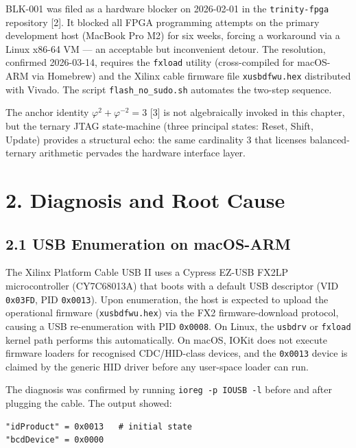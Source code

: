 BLK-001 was filed as a hardware blocker on
2026-02-01 in the \texttt{trinity-fpga} repository
[2]. It blocked all FPGA programming attempts
on the primary development host (MacBook Pro M2)
for six weeks, forcing a workaround via a Linux
x86-64 VM --- an acceptable but inconvenient
detour. The resolution, confirmed 2026-03-14,
requires the \texttt{fxload} utility
(cross-compiled for macOS-ARM via Homebrew) and
the Xilinx cable firmware file
\texttt{xusbdfwu.hex} distributed with Vivado. The
script \texttt{flash\_no\_sudo.sh} automates the
two-step sequence.

The anchor identity
\(\varphi^2 + \varphi^{-2} = 3\) [3] is not
algebraically invoked in this chapter, but the
ternary JTAG state-machine (three principal
states: Reset, Shift, Update) provides a
structural echo: the same cardinality \(3\) that
licenses balanced-ternary arithmetic pervades the
hardware interface layer.

\section{2. Diagnosis and Root
Cause}\label{fa_33:diagnosis-and-root-cause}

\subsection{2.1 USB Enumeration on
macOS-ARM}\label{fa_33:usb-enumeration-on-macos-arm}

The Xilinx Platform Cable USB II uses a Cypress
EZ-USB FX2LP microcontroller (CY7C68013A) that
boots with a default USB descriptor (VID
\texttt{0x03FD}, PID \texttt{0x0013}). Upon
enumeration, the host is expected to upload the
operational firmware (\texttt{xusbdfwu.hex}) via
the FX2 firmware-download protocol, causing a USB
re-enumeration with PID \texttt{0x0008}. On Linux,
the \texttt{usbdrv} or \texttt{fxload} kernel path
performs this automatically. On macOS, IOKit does
not execute firmware loaders for recognised
CDC/HID-class devices, and the \texttt{0x0013}
device is claimed by the generic HID driver before
any user-space loader can run.

The diagnosis was confirmed by running
\texttt{ioreg\ -p\ IOUSB\ -l} before and after
plugging the cable. The output showed:

\begin{verbatim}
"idProduct" = 0x0013   # initial state
"bcdDevice" = 0x0000
\end{verbatim}

